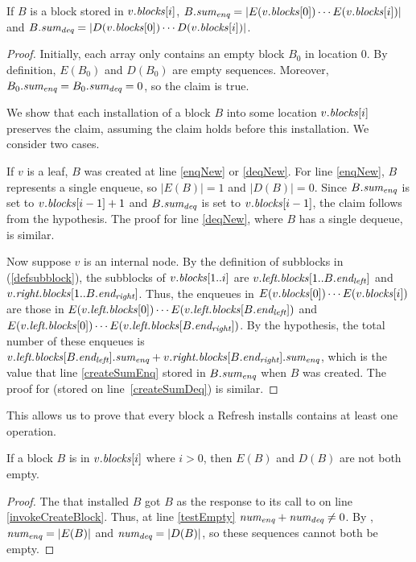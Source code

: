 \begin{invariant}\label{lem::sum}
If $B$ is a block stored in $v.\mbox{\textit{blocks}}[i]$,
$B.\mbox{\textit{sum\textsubscript{enq}}} = | E(v.\mbox{\textit{blocks}}[0])\cdots E(v.\mbox{\textit{blocks}}[i]) |$ and
$B.\mbox{\textit{sum\textsubscript{deq}}} = | D(v.\mbox{\textit{blocks}}[0])\cdots D(v.\mbox{\textit{blocks}}[i]) |$.
\end{invariant}
\begin{proof}
Initially, each  array only contains an empty block $B_0$ in location 0.
By definition, $E(B_0)$ and $D(B_0)$ are empty sequences.
Moreover, $B_0.\mbox{\textit{sum\textsubscript{enq}}} = B_0.\mbox{\textit{sum\textsubscript{deq}}} = 0$, so the claim is true.

We show that each installation of a block $B$ into some location $v.\mbox{\textit{blocks}}[i]$ preserves the claim,
assuming the claim holds before this installation.  We consider two cases.

If $v$ is a leaf, $B$ was created at line \ref{enqNew} or \ref{deqNew}.
For line \ref{enqNew}, $B$ represents a single enqueue, so $|E(B)|=1$ and $|D(B)|=0$.
Since $B.\mbox{\textit{sum\textsubscript{enq}}}$ is set to $v.\mbox{\textit{blocks}}[i-1]+1$ and
$B.\mbox{\textit{sum\textsubscript{deq}}}$ is set to $v.\mbox{\textit{blocks}}[i-1]$, the claim follows from the hypothesis.
The proof for line \ref{deqNew}, where $B$ has a single dequeue, is similar.

Now suppose $v$ is an internal node. By the definition of subblocks in (\ref{defsubblock}), the
subblocks of $v.\mbox{\textit{blocks}}[1..i]$ are $v.\mbox{\textit{left.blocks}}[1..B.\mbox{\textit{end\textsubscript{left}}}]$ 
and $v.\mbox{\textit{right.blocks}}[1..B.\mbox{\textit{end\textsubscript{right}}}]$.
Thus, the enqueues in $E(v.\mbox{\textit{blocks}}[0])\cdots E(v.\mbox{\textit{blocks}}[i])$ are those in
$E(v.\mbox{\textit{left.blocks}}[0]) \cdots E(v.\mbox{\textit{left.blocks}}[B.\mbox{\textit{end\textsubscript{left}}}])$ and
$E(v.\mbox{\textit{left.blocks}}[0]) \cdots E(v.\mbox{\textit{left.blocks}}[B.\mbox{\textit{end\textsubscript{right}}}])$.
By the hypothesis, the total number of these enqueues is $v.\mbox{\textit{left.blocks}}[B.\mbox{\textit{end\textsubscript{left}}}].\mbox{\textit{sum\textsubscript{enq}}} + v.\mbox{\textit{right.blocks}}[B.\mbox{\textit{end\textsubscript{right}}}].\mbox{\textit{sum\textsubscript{enq}}}$, which is the value that line \ref{createSumEnq} stored in $B.\mbox{\textit{sum\textsubscript{enq}}}$ when $B$ was created.
The proof for  (stored on line~\ref{createSumDeq}) is similar.
\end{proof}

This allows us to prove that every block a Refresh installs contains at least one operation.

\begin{corollary}\label{blockNotEmpty}
If a block $B$ is in $v.\mbox{\textit{blocks}}[i]$ where $i>0$, then $E(B)$ and $D(B)$ are not both empty.
\end{corollary}
\begin{proof}
The  that installed $B$ got $B$ as the response to its call to  on line \ref{invokeCreateBlock}.
Thus, at line \ref{testEmpty} $\mbox{\textnormal{\textit{num\textsubscript{enq}}}}+\mbox{\textnormal{\textit{num\textsubscript{deq}}}}\neq 0$.
By , $\mbox{\textnormal{\textit{num\textsubscript{enq}}}} = |E(B)|$ and $\mbox{\textnormal{\textit{num\textsubscript{deq}}}} = |D(B)|$,
so these sequences cannot both be empty.
\end{proof}



